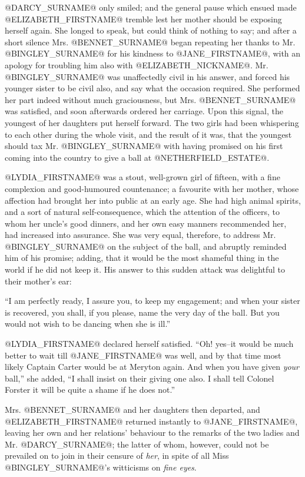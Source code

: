 @DARCY_SURNAME@ only smiled; and the general pause which ensued made @ELIZABETH_FIRSTNAME@
tremble lest her mother should be exposing herself again. She longed to
speak, but could think of nothing to say; and after a short silence Mrs.
@BENNET_SURNAME@ began repeating her thanks to Mr. @BINGLEY_SURNAME@ for his kindness to
@JANE_FIRSTNAME@, with an apology for troubling him also with @ELIZABETH_NICKNAME@. Mr. @BINGLEY_SURNAME@ was
unaffectedly civil in his answer, and forced his younger sister to be
civil also, and say what the occasion required. She performed her part
indeed without much graciousness, but Mrs. @BENNET_SURNAME@ was satisfied, and
soon afterwards ordered her carriage. Upon this signal, the youngest of
her daughters put herself forward. The two girls had been whispering to
each other during the whole visit, and the result of it was, that the
youngest should tax Mr. @BINGLEY_SURNAME@ with having promised on his first coming
into the country to give a ball at @NETHERFIELD_ESTATE@.

@LYDIA_FIRSTNAME@ was a stout, well-grown girl of fifteen, with a fine complexion
and good-humoured countenance; a favourite with her mother, whose
affection had brought her into public at an early age. She had high
animal spirits, and a sort of natural self-consequence, which the
attention of the officers, to whom her uncle's good dinners, and her own
easy manners recommended her, had increased into assurance. She was very
equal, therefore, to address Mr. @BINGLEY_SURNAME@ on the subject of the ball, and
abruptly reminded him of his promise; adding, that it would be the most
shameful thing in the world if he did not keep it. His answer to this
sudden attack was delightful to their mother's ear:

``I am perfectly ready, I assure you, to keep my engagement; and when
your sister is recovered, you shall, if you please, name the very day of
the ball. But you would not wish to be dancing when she is ill.''

@LYDIA_FIRSTNAME@ declared herself satisfied. ``Oh! yes--it would be much better to
wait till @JANE_FIRSTNAME@ was well, and by that time most likely Captain Carter
would be at Meryton again. And when you have given \textit{your} ball,'' she
added, ``I shall insist on their giving one also. I shall tell Colonel
Forster it will be quite a shame if he does not.''

Mrs. @BENNET_SURNAME@ and her daughters then departed, and @ELIZABETH_FIRSTNAME@ returned
instantly to @JANE_FIRSTNAME@, leaving her own and her relations' behaviour to the
remarks of the two ladies and Mr. @DARCY_SURNAME@; the latter of whom, however,
could not be prevailed on to join in their censure of \textit{her}, in spite of
all Miss @BINGLEY_SURNAME@'s witticisms on \textit{fine eyes}.



